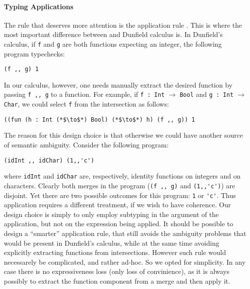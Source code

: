 \paragraph{Typing Applications} 
The rule that deserves more attention is the application rule
.  This is where the most important difference between
\name and Dunfield calculus is. In Dunfield's calculus, if
\lstinline$f$ and \lstinline$g$ are both functions expecting an
integer, the following program typechecks:

\begin{lstlisting}
(f ,, g) 1
\end{lstlisting}

\noindent In our calculus, however, one needs manually extract the desired
function by passing \lstinline$f ,, g$ to a function. For example, if
\lstinline$f : Int$ $\to$  \lstinline$Bool$ and \lstinline$g : Int$ $\to$ \lstinline$Char$, we could select  \lstinline$f$
from the intersection as follows:

\begin{lstlisting}
((fun (h : Int (*$\to$*) Bool) (*$\to$*) h) (f ,, g)) 1
\end{lstlisting}

The reason for this design choice is that otherwise we could have
another source of semantic ambiguity. Consider the following program:

\begin{lstlisting}
(idInt ,, idChar) (1,,'c')
\end{lstlisting}

\noindent where \lstinline$idInt$ and \lstinline$idChar$ are,
respectively, identity functions on integers and on characters. Clearly both
merges in the program (\lstinline$(f ,, g)$ and \lstinline$(1,,'c')$)
are disjoint. Yet there are two possible outcomes for this program:
\lstinline$1$ or \lstinline$'c'$. Thus application requires a
different treatment, if we wish to have coherence.
Our design choice is simply to only employ subtyping in the argument
of the application, but not on the expression being applied.
It should be possible to design a ``smarter''
application rule, that still avoids the ambiguity problems that would
be present in Dunfield's calculus, while at the same time avoiding 
explicitly extracting functions from intersections. However such rule 
would necessarely be complicated, and rather ad-hoc. 
So we opted for simplicity. In any case there is no expressiveness
loss (only loss of convinience), as it is always possibly to extract the function component from
a merge and then apply it.

